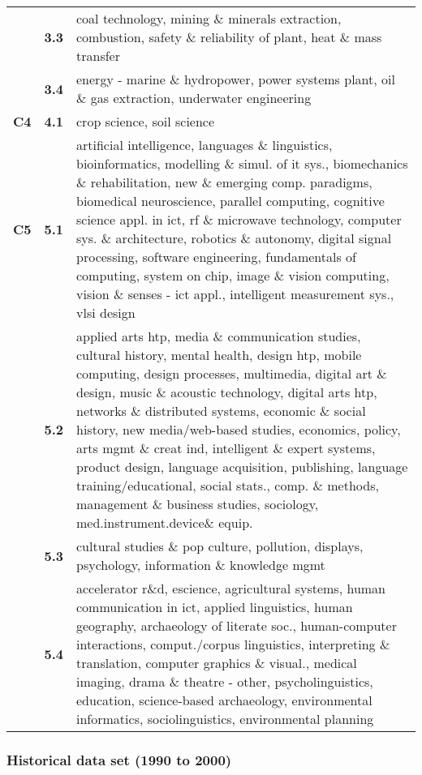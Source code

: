 \begin{spacing}{0.9}
\begin{longtable}[r]{r|r|p{11.5cm}}
& \textbf{3.3} & {coal technology, mining \& minerals extraction, combustion, safety \& reliability of plant, heat \& mass transfer}\\
& \textbf{3.4} & {energy - marine \& hydropower, power systems plant, oil \& gas extraction, underwater engineering}\\
\hline
\textbf{C4}
& \textbf{4.1} & {crop science, soil science}\\
\hline
\textbf{C5}
& \textbf{5.1} & {artificial intelligence, languages \& linguistics, bioinformatics, modelling \& simul. of it sys., biomechanics \& rehabilitation, new \& emerging comp. paradigms, biomedical neuroscience, parallel computing, cognitive science appl. in ict, rf \& microwave technology, computer sys. \& architecture, robotics \& autonomy, digital signal processing, software engineering, fundamentals of computing, system on chip, image \& vision computing, vision \& senses - ict appl., intelligent measurement sys., vlsi design}\\
& \textbf{5.2} & {applied arts htp, media \& communication studies, cultural history, mental health, design htp, mobile computing, design processes, multimedia, digital art \& design, music \& acoustic technology, digital arts htp, networks \& distributed systems, economic \& social history, new media/web-based studies, economics, policy, arts mgmt \& creat ind, intelligent \& expert systems, product design, language acquisition, publishing, language training/educational, social stats., comp. \& methods, management \& business studies, sociology, med.instrument.device\& equip.}\\
& \textbf{5.3} & {cultural studies \& pop culture, pollution, displays, psychology, information \& knowledge mgmt}\\
& \textbf{5.4} & {accelerator r\&d, escience, agricultural systems, human communication in ict, applied linguistics, human geography, archaeology of literate soc., human-computer interactions, comput./corpus linguistics, interpreting \& translation, computer graphics \& visual., medical imaging, drama \& theatre - other, psycholinguistics, education, science-based archaeology, environmental informatics, sociolinguistics, environmental planning}
\end{longtable}
\end{spacing}

\clearpage

\subsubsection{Historical data set (1990 to 2000)}

